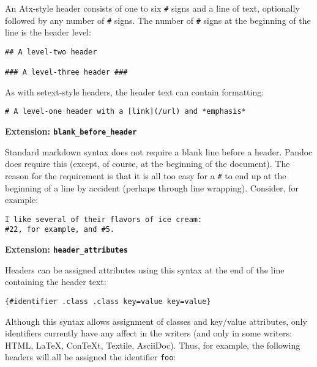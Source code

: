 \documentclass[]{article}
\begin{document}
An Atx-style header consists of one to six \texttt{\#} signs and a line
of text, optionally followed by any number of \texttt{\#} signs. The
number of \texttt{\#} signs at the beginning of the line is the header
level:

\begin{verbatim}
## A level-two header

### A level-three header ###
\end{verbatim}

As with setext-style headers, the header text can contain formatting:

\begin{verbatim}
# A level-one header with a [link](/url) and *emphasis*
\end{verbatim}

\textbf{Extension: \texttt{blank\_before\_header}}

Standard markdown syntax does not require a blank line before a header.
Pandoc does require this (except, of course, at the beginning of the
document). The reason for the requirement is that it is all too easy for
a \texttt{\#} to end up at the beginning of a line by accident (perhaps
through line wrapping). Consider, for example:

\begin{verbatim}
I like several of their flavors of ice cream:
#22, for example, and #5.
\end{verbatim}


\textbf{Extension: \texttt{header\_attributes}}

Headers can be assigned attributes using this syntax at the end of the
line containing the header text:

\begin{verbatim}
{#identifier .class .class key=value key=value}
\end{verbatim}

Although this syntax allows assignment of classes and key/value
attributes, only identifiers currently have any affect in the writers
(and only in some writers: HTML, LaTeX, ConTeXt, Textile, AsciiDoc).
Thus, for example, the following headers will all be assigned the
identifier \texttt{foo}:
\end{document}
